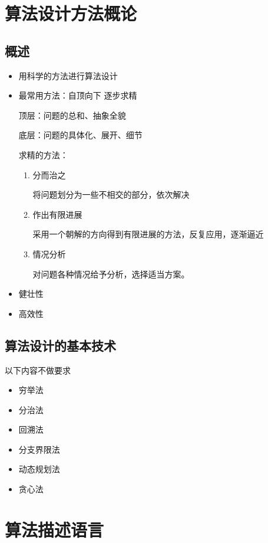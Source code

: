 \documentclass[AutoFakeBold]{LZUThesis2007}
\begin{document}
	\section{算法设计方法概论}
		\subsection{概述}
			\begin{itemize}
				\item 用科学的方法进行算法设计
				\item 最常用方法：自顶向下 逐步求精

						顶层：问题的总和、抽象全貌

						底层：问题的具体化、展开、细节

						求精的方法：

					\begin{enumerate}
						\item 分而治之

								将问题划分为一些不相交的部分，依次解决

						\item 作出有限进展

								采用一个朝解的方向得到有限进展的方法，反复应用，逐渐逼近

						\item 情况分析

								对问题各种情况给予分析，选择适当方案。

					\end{enumerate}

				\item 健壮性
				\item 高效性
			\end{itemize}

		\subsection{算法设计的基本技术}
			以下内容不做要求
			\begin{itemize}
				\item 穷举法
				\item 分治法
				\item 回溯法
				\item 分支界限法
				\item 动态规划法
				\item 贪心法
			\end{itemize}

	\section{算法描述语言}
\end{document}
